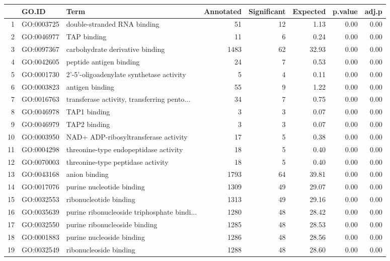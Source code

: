 \begin{table}[ht]
\centering
\begin{tabular}{rllrrrrr}
  \hline
 & GO.ID & Term & Annotated & Significant & Expected & p.value & adj.p \\ 
  \hline
1 & GO:0003725 & double-stranded RNA binding &  51 &  12 & 1.13 & 0.00 & 0.00 \\ 
  2 & GO:0046977 & TAP binding &  11 &   6 & 0.24 & 0.00 & 0.00 \\ 
  3 & GO:0097367 & carbohydrate derivative binding & 1483 &  62 & 32.93 & 0.00 & 0.00 \\ 
  4 & GO:0042605 & peptide antigen binding &  24 &   7 & 0.53 & 0.00 & 0.00 \\ 
  5 & GO:0001730 & 2'-5'-oligoadenylate synthetase activity &   5 &   4 & 0.11 & 0.00 & 0.00 \\ 
  6 & GO:0003823 & antigen binding &  55 &   9 & 1.22 & 0.00 & 0.00 \\ 
  7 & GO:0016763 & transferase activity, transferring pento... &  34 &   7 & 0.75 & 0.00 & 0.00 \\ 
  8 & GO:0046978 & TAP1 binding &   3 &   3 & 0.07 & 0.00 & 0.00 \\ 
  9 & GO:0046979 & TAP2 binding &   3 &   3 & 0.07 & 0.00 & 0.00 \\ 
  10 & GO:0003950 & NAD+ ADP-ribosyltransferase activity &  17 &   5 & 0.38 & 0.00 & 0.00 \\ 
  11 & GO:0004298 & threonine-type endopeptidase activity &  18 &   5 & 0.40 & 0.00 & 0.00 \\ 
  12 & GO:0070003 & threonine-type peptidase activity &  18 &   5 & 0.40 & 0.00 & 0.00 \\ 
  13 & GO:0043168 & anion binding & 1793 &  64 & 39.81 & 0.00 & 0.00 \\ 
  14 & GO:0017076 & purine nucleotide binding & 1309 &  49 & 29.07 & 0.00 & 0.00 \\ 
  15 & GO:0032553 & ribonucleotide binding & 1313 &  49 & 29.16 & 0.00 & 0.00 \\ 
  16 & GO:0035639 & purine ribonucleoside triphosphate bindi... & 1280 &  48 & 28.42 & 0.00 & 0.00 \\ 
  17 & GO:0032550 & purine ribonucleoside binding & 1285 &  48 & 28.53 & 0.00 & 0.00 \\ 
  18 & GO:0001883 & purine nucleoside binding & 1286 &  48 & 28.56 & 0.00 & 0.00 \\ 
  19 & GO:0032549 & ribonucleoside binding & 1288 &  48 & 28.60 & 0.00 & 0.00 \\ 

\end{tabular}
\end{table}
